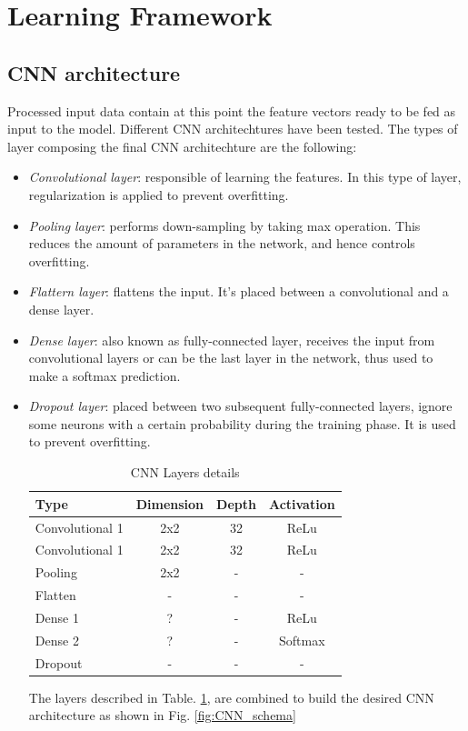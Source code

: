 \section{Learning Framework}
\label{sec:learning_framework}

\subsection*{\textbf {CNN architecture}}
\label{subsec:arch}
\noindent Processed input data contain at this point the feature vectors ready to be fed as input to the model. Different CNN architechtures have been tested. The types of layer composing the final CNN architechture are the following:
\begin{itemize}
\item {\it{Convolutional layer}}: responsible of learning the features. In this type of layer, regularization is applied to prevent overfitting.
\item {\it{Pooling layer}}: performs down-sampling by taking max operation. This reduces the amount of parameters in the network, and hence controls overfitting.
\item {\it{Flattern layer}}: flattens the input. It's placed between a convolutional and a dense layer.
\item {\it{Dense layer}}: also known as fully-connected layer, receives the input from convolutional layers or can be the last layer in the network, thus used to make a softmax prediction.
\item {\it{Dropout layer}}: placed between two subsequent fully-connected layers, ignore some neurons with a certain probability during the training phase. It is used to prevent overfitting.\\

\begin{table}[h!]
\centering
\begin{tabular}{| p{3cm} c c c |}
 \hline
Type & Dimension & Depth & Activation\\
\hline
Convolutional 1 & 2x2 & 32 & ReLu \\
Convolutional 1 & 2x2 & 32 & ReLu \\
Pooling & 2x2 & - & -\\
Flatten & - & - & -\\
Dense 1 & ? & - & ReLu \\
Dense 2 & ? & - &Softmax \\
Dropout & - &  - & -\\
\hline
\end{tabular}
\caption{CNN Layers details}
\label{table:CNN_details}
\end{table}

The layers described in Table. \ref{table:CNN_details}, are combined to build the desired CNN architecture as shown in Fig. \ref{fig:CNN_schema}

\end{itemize}
